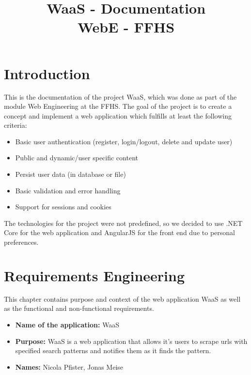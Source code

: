 \documentclass[titlepage, 12pt]{article}
\author{\authorName}
\title{WaaS - Documentation \\ \medskip \large WebE - FFHS}
\begin{document}
\maketitle

\pagebreak

\renewcommand{\contentsname}{Table of Contents}

\tableofcontents

\pagebreak

\section{Introduction}

This is the documentation of the project WaaS, which was done as part of the module Web Engineering at the FFHS. The goal of the project is to create a concept and implement a web application which fulfills at least the following criteria:

\begin{itemize}
  \item Basic user authentication (register, login/logout, delete and update user)
  \item Public and dynamic/user specific content
  \item Persist user data (in database or file)
  \item Basic validation and error handling
  \item Support for sessions and cookies
\end{itemize}

The technologies for the project were not predefined, so we decided to use .NET Core for the web application and AngularJS for the front end due to personal preferences.

\pagebreak

\section{Requirements Engineering\label{sectionRequirementsEngineering}}

This chapter contains purpose and context of the web application WaaS as well as the functional and non-functional requirements.

\begin{itemize}
  \item \textbf{Name of the application:} WaaS
  \item \textbf{Purpose:} WaaS is a web application that allows it's users to scrape urls with specified search patterns and notifies them as it finds the pattern.
  \item \textbf{Names:} Nicola Pfister, Jonas Meise
\end{itemize}
\end{document}
